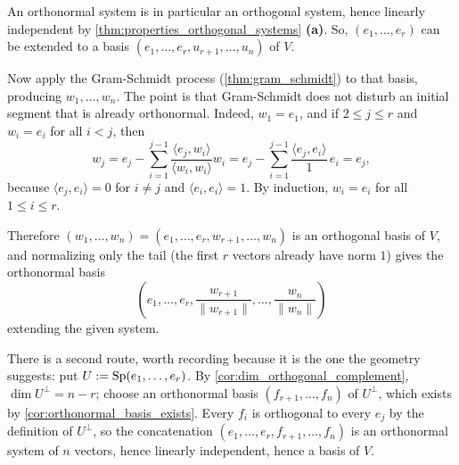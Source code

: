 \begin{exercisesolution}
\label{sol:extend_orthonormal_system}
  An orthonormal system is in particular an orthogonal system, hence linearly independent by \cref{thm:properties_orthogonal_systems} \textbf{(a)}. So, $(e_1, \dots, e_r)$ can be extended to a basis $(e_1, \dots, e_r, u_{r+1}, \dots, u_n)$ of $V$.

  Now apply the Gram-Schmidt process (\cref{thm:gram_schmidt}) to that basis, producing $w_1, \dots, w_n$. The point is that Gram-Schmidt does not disturb an initial segment that is already orthonormal. Indeed, $w_1 = e_1$, and if $2 \le j \le r$ and $w_i = e_i$ for all $i < j$, then
  \[ w_j = e_j - \sum_{i=1}^{j-1} \frac{\langle e_j, w_i \rangle}{\langle w_i, w_i \rangle} w_i = e_j - \sum_{i=1}^{j-1} \frac{\langle e_j, e_i \rangle}{1} \, e_i = e_j, \]
  because $\langle e_j, e_i \rangle = 0$ for $i \ne j$ and $\langle e_i, e_i \rangle = 1$. By induction, $w_i = e_i$ for all $1 \le i \le r$.

  Therefore $(w_1, \dots, w_n) = (e_1, \dots, e_r, w_{r+1}, \dots, w_n)$ is an orthogonal basis of $V$, and normalizing only the tail (the first $r$ vectors already have norm $1$) gives the orthonormal basis
  \[ \left( e_1, \dots, e_r, \frac{w_{r+1}}{\|w_{r+1}\|}, \dots, \frac{w_n}{\|w_n\|} \right) \]
  extending the given system.

  There is a second route, worth recording because it is the one the geometry suggests: put $U := \operatorname{Sp}(e_1, \dots, e_r)$. By \cref{cor:dim_orthogonal_complement}, $\dim U^\perp = n - r$; choose an orthonormal basis $(f_{r+1}, \dots, f_n)$ of $U^\perp$, which exists by \cref{cor:orthonormal_basis_exists}. Every $f_i$ is orthogonal to every $e_j$ by the definition of $U^\perp$, so the concatenation $(e_1, \dots, e_r, f_{r+1}, \dots, f_n)$ is an orthonormal system of $n$ vectors, hence linearly independent, hence a basis of $V$.
\end{exercisesolution}

